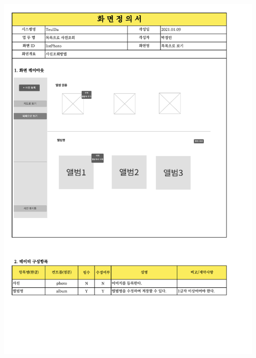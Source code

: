 {{{{{{{{{{{{{{{{{{{{{{{{{{{{{{{{{{{{\includegraphics[width=20cm]{./Figure/Analysis/Display/photo/photo_03.pdf} \\
}}}}}}}}}}}}}}}}}}}}}}}}}}}}}}}}}}}}
